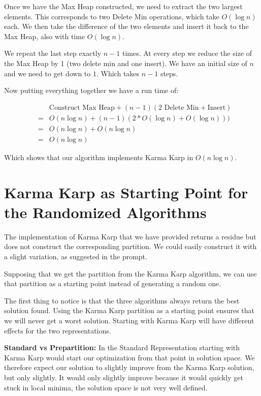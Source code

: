 \documentclass[11pt]{article}
\begin{document}
Once we have the Max Heap constructed, we need to extract the two largest elements. This corresponds to two Delete Min operations, which take $O(\log n)$ each. We then take the difference of the two elements and insert it back to the Max Heap, also with time $O(\log n)$.

We repeat the last step exactly $n-1$ times. At every step we reduce the size of the Max Heap by 1 (two delete min and one insert). We have an initial size of $n$ and we need to get down to $1$. Which takes $n-1$ steps.

Now putting everything together we have a run time of:

\begin{eqnarray}
&&\text{Construct Max Heap} + (n-1)(\text{2 Delete Min}+\text{Insert})\\
&=& O(n \log n)+(n-1)(2*O(\log n)+O(\log n)))\\
&=& O(n\log n) + O(n\log n)\\
&=& \boxed{O(n\log n)}
\end{eqnarray}

Which shows that our algorithm implements Karma Karp in $O(n\log n)$.


\section{Karma Karp as Starting Point for the Randomized Algorithms}
The implementation of Karma Karp that we have provided returns a residue but does not construct the corresponding partition. We could easily construct it with a slight variation, as suggested in the prompt.

Supposing that we get the partition from the Karma Karp algorithm, we can use that partition as a starting point instead of generating a random one.

The first thing to notice is that the three algorithms always return the best solution found. Using the Karma Karp partition as a starting point ensures that we will never get a worst solution. Starting with Karma Karp will have different effects for the two representations.

\textbf{Standard vs Prepartition:}
In the Standard Representation starting with Karma Karp would start our optimization from that point in solution space. We therefore expect our solution to slightly improve from the Karma Karp solution, but only slightly. It would only slightly improve because it would quickly get stuck in local minima, the solution space is not very well defined. 
\end{document}
